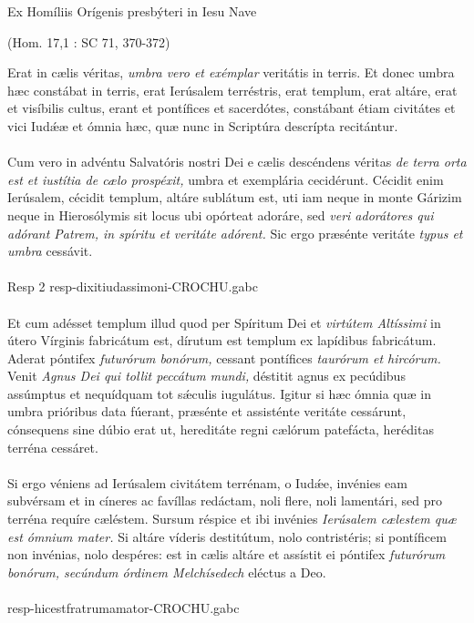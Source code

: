 \documentclass[options]{article}
\begin{document}
	Ex Homíliis Orígenis presbýteri in Iesu Nave 
	\begin{flushright}
		(Hom. 17,1 : SC 71, 370-372)
	\end{flushright}

Erat in cælis véritas,
\emph{umbra vero et exémplar}
veritátis in terris. Et donec umbra hæc constábat in terris, erat Ierúsalem terréstris, erat templum, erat altáre, erat et visíbilis cultus, erant et pontífices et sacerdótes, constábant étiam civitátes et vici Iud\'{æ}æ et ómnia hæc, quæ nunc in Scriptúra descrípta recitántur.\\
\\
Cum vero in advéntu Salvatóris nostri Dei e cælis descéndens véritas \emph{de terra orta est et iustítia de cælo prospéxit,} umbra et exemplária cecidérunt. Cécidit enim Ierúsalem, cécidit templum, altáre sublátum est, uti iam neque in monte Gárizim neque in Hierosólymis sit locus ubi opórteat adoráre, sed 
\emph{veri adorátores qui adórant Patrem, in spíritu et veritáte adórent.}
Sic ergo præsénte veritáte \emph{typus et umbra} cessávit.\\
\\
Resp 2  resp-dixitiudassimoni-CROCHU.gabc\\
\\
Et cum adésset templum illud quod per Spíritum Dei et \emph{virtútem Altíssimi} in útero Vírginis fabricátum est, dírutum est templum ex lapídibus fabricátum. Aderat póntifex \emph{futurórum bonórum,} cessant pontífices \emph{taurórum et hircórum.}
 Venit \emph{Agnus Dei qui tollit peccátum mundi,} déstitit agnus ex pecúdibus assúmptus et nequídquam tot s\'{æ}culis iugulátus. Igitur si hæc ómnia quæ in umbra prióribus data fúerant, præsénte et assisténte veritáte cessárunt, cónsequens sine dúbio erat ut, hereditáte regni cælórum patefácta, heréditas terréna cessáret.\\
 \\
 Si ergo véniens ad Ierúsalem civitátem terrénam, o Iud\'{æ}e, invénies eam subvérsam et in cíneres ac favíllas redáctam, noli flere, noli lamentári, sed pro terréna requíre cæléstem. Sursum réspice et ibi invénies \emph{Ierúsalem cælestem quæ est ómnium mater.} Si altáre víderis destitútum, nolo contristéris; si pontíficem non invénias, nolo despéres: est in cælis altáre et assístit ei póntifex \emph{futurórum bonórum, secúndum órdinem Melchísedech} eléctus a Deo.\\
 \\
 resp-hicestfratrumamator-CROCHU.gabc\\
 
 
 
\end{document}
